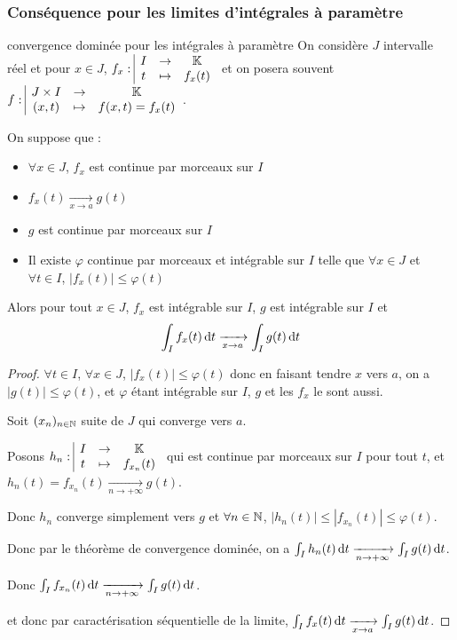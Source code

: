 \subsubsection{Conséquence pour les limites d'intégrales à paramètre}

\begin{proposition}{convergence dominée pour les intégrales à paramètre}{}
    On considère $J$ intervalle réel et pour $x \in J$, $f_x: \space \begin{array}{|ccc} \displaystyle I & \to & \displaystyle \mathbb{K} \\ \displaystyle t & \mapsto & \displaystyle f_x(t) \end{array}$
    et on posera souvent $f: \space \begin{array}{|ccc} \displaystyle J \times I & \to & \displaystyle \mathbb{K} \\ \displaystyle (x, t) & \mapsto & \displaystyle f(x, t) = f_x(t) \end{array}$.

    On suppose que : 
    \begin{itemize}
        \item $\forall x \in J$, $f_x$ est continue par morceaux sur $I$
        \item $f_x(t) \xrightarrow[x \to a]{} g(t)$
        \item $g$ est continue par morceaux sur $I$
        \item Il existe $\varphi$ continue par morceaux et intégrable sur $I$ telle que 
        $\forall x \in J$ et $\forall t \in I$, $|f_x(t)| \leqslant \varphi(t)$
    \end{itemize}

    Alors pour tout $x \in J$, $f_x$ est intégrable sur $I$, $g$ est intégrable sur $I$ et 
    $$\int_I f_x(t) \,\mathrm{d}t \xrightarrow[x \to a]{} \int_I g(t) \,\mathrm{d}t$$
\end{proposition}


\begin{proof}
    $\forall t \in I$, $\forall x \in J$, $|f_x(t)| \leqslant \varphi(t)$ donc en faisant tendre 
    $x$ vers $a$, on a $|g(t)| \leqslant \varphi(t)$, et $\varphi$ étant intégrable sur 
    $I$, $g$ et les $f_x$ le sont aussi. 

    Soit $(x_n)_{n \in \mathbb{N}}$ suite de $J$ qui converge vers $a$. 

    Posons $h_n: \space \begin{array}{|ccc} \displaystyle I & \to & \displaystyle \mathbb{K} \\ \displaystyle t & \mapsto & \displaystyle f_{x_n}(t) \end{array}$ qui est continue par morceaux sur $I$ pour 
    tout $t$, et $h_n(t) = f_{x_n}(t) \xrightarrow[n \to + \infty]{} g(t)$.

    Donc $h_n$ converge simplement vers $g$ et $\forall n \in \mathbb{N}$, $|h_n(t)| \leqslant |f_{x_n}(t)| \leqslant \varphi(t)$.

    Donc par le théorème de convergence dominée, on a $\int_I h_n(t) \,\mathrm{d}t \xrightarrow[n \to + \infty]{} \int_I g(t) \,\mathrm{d}t$.

    Donc $\int_I f_{x_n}(t) \,\mathrm{d}t \xrightarrow[n \to + \infty]{} \int_I g(t) \,\mathrm{d}t$.

    et donc par caractérisation séquentielle de la limite, $\int_I f_x(t) \,\mathrm{d}t \xrightarrow[x \to a]{} \int_I g(t) \,\mathrm{d}t$.
\end{proof}


